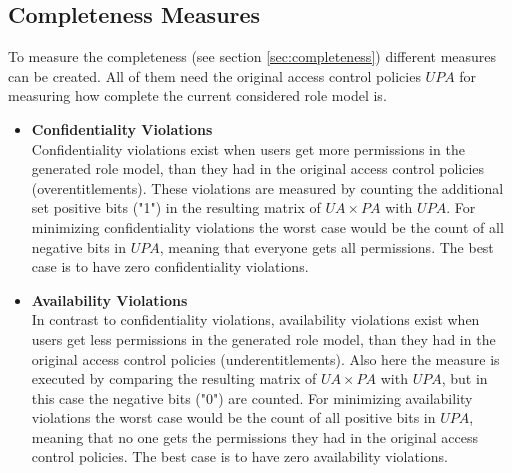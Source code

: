     \subsection{Completeness Measures}
    \label{sec:optimizationCompleteness}
    To measure the completeness (see section \ref{sec:completeness}) different measures can be created. All of them need the original access control policies $UPA$ for measuring how complete the current considered role model is.
    
    \begin{itemize}
    	\item \textbf{Confidentiality Violations}\\
    	Confidentiality violations exist when users get more permissions in the generated role model, than they had in the original access control policies (overentitlements). These violations are measured by counting the additional set positive bits ("1") in the resulting matrix of $UA \times PA$ with $UPA$. 
    	For minimizing confidentiality violations the worst case would be the count of all negative bits in $UPA$, meaning that everyone gets all permissions. The best case is to have zero confidentiality violations.
    	
    	\item \textbf{Availability Violations}\\
    	In contrast to confidentiality violations, availability violations exist when users get less permissions in the generated role model, than they had in the original access control policies (underentitlements). Also here the measure is executed by comparing the resulting matrix of $UA \times PA$ with $UPA$, but in this case the negative bits ("0") are counted.
    	For minimizing availability violations the worst case would be the count of all positive bits in $UPA$, meaning that no one gets the permissions they had in the original access control policies. The best case is to have zero availability violations.
    	
    	\iffalse \item \textbf{Confidentiality and Availability Violations}\\
    	One fitness function is sum of the confidentiality violations and availability violations. Before the values are added, they get normalized. The worst case of availability violations is the count of all positive bits in $UPA$, meaning that no one gets the permissions they had in the original access control policies. The worst case of confidentiality violations is the count of all negative bits in $UPA$, meaning that everyone gets all permissions. For both violation counts 0 is the best case. With the normalization the measures can be weighted, e.g. if availability violations are more acceptable than confidentiality violations, the weight for the later can be bigger.\fi
    	

\end{itemize}
